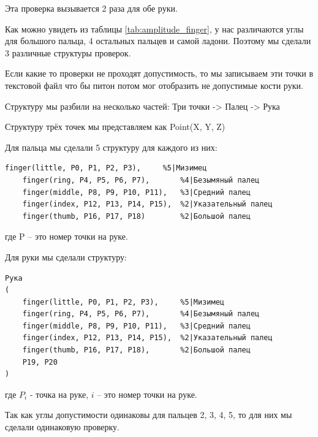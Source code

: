\hspace{0.6cm}Эта проверка вызывается 2 раза для обе руки.

\hspace{0.6cm} Как можно увидеть из таблицы \ref{tab:amplitude_finger}, у нас различаются углы для большого пальца, 4 остальных пальцев и самой ладони. Поэтому мы сделали 3 различные структуры проверок.

\hspace{0.6cm} Если какие то проверки не проходят допустимость, то мы записываем эти точки в текстовой файл что бы питон потом мог отобразить не допустимые кости руки.

\hspace{0.6cm} Структуру мы разбили на несколько частей: Три точки -> Палец -> Рука

\hspace{0.6cm} Структуру трёх точек мы представляем как Point(X, Y, Z)

\hspace{0.6cm} Для пальца мы сделали 5 структуру для каждого из них:
	
\begin{lstlisting}[caption=Листинг структур пальцев, label=struct:finger]
	finger(little, P0, P1, P2, P3),		%5|Мизимец
	finger(ring, P4, P5, P6, P7),		%4|Безымяный палец
	finger(middle, P8, P9, P10, P11),	%3|Средний палец
	finger(index, P12, P13, P14, P15),	%2|Указательный палец
	finger(thumb, P16, P17, P18)		%2|Большой палец
\end{lstlisting}
\hspace{0.6cm} где P – это номер точки на руке.

\hspace{0.6cm} Для руки мы сделали структуру:
\begin{lstlisting}[caption=Листинг структуры руки, label=struct:hand]
Рука
(
	finger(little, P0, P1, P2, P3),		%5|Мизимец
	finger(ring, P4, P5, P6, P7),		%4|Безымяный палец
	finger(middle, P8, P9, P10, P11),	%3|Средний палец
	finger(index, P12, P13, P14, P15),	%2|Указательный палец
	finger(thumb, P16, P17, P18),		%2|Большой палец
	P19, P20
)
\end{lstlisting}

\hspace{0.6cm} где $P_{i}$ - точка на руке, $i$ – это номер точки на руке.

\hspace{0.6cm} Так как углы допустимости одинаковы для пальцев 2, 3, 4, 5, то для них мы сделали одинаковую проверку.

